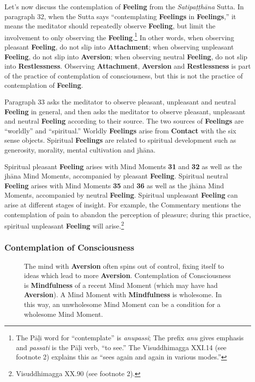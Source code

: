 Let’s now discuss the contemplation of \textbf{Feeling} from the \textit{Satipaṭṭhāna} Sutta. In paragraph 32, when the Sutta says “contemplating \textbf{Feelings} in \textbf{Feelings},” it means the meditator should repeatedly observe \textbf{Feeling}, but limit the involvement to only observing the \textbf{Feeling}.\footnote{The Pāḷi word for “contemplate” is \textit{anupassi}; The prefix \textit{anu} gives emphasis and \textit{passati} is the Pāḷi verb, “to see.” The Visuddhimagga XXI.14 (see footnote 2) explains this as “sees again and again in various modes.”} In other words, when observing pleasant \textbf{Feeling}, do not slip into \textbf{Attachment}; when observing unpleasant \textbf{Feeling}, do not slip into \textbf{Aversion}; when observing neutral \textbf{Feeling}, do not slip into \textbf{Restlessness}. Observing \textbf{Attachment}, \textbf{Aversion} and \textbf{Restlessness} is part of the practice of contemplation of consciousness, but this is not the practice of contemplation of \textbf{Feeling}.

Paragraph 33 asks the meditator to observe pleasant, unpleasant and neutral \textbf{Feeling} in general, and then asks the meditator to observe pleasant, unpleasant and neutral \textbf{Feeling} according to their source. The two sources of \textbf{Feelings} are “worldly” and “spiritual.” Worldly \textbf{Feelings} arise from \textbf{Contact} with the six sense objects. Spiritual \textbf{Feelings} are related to spiritual development such as generosity, morality, mental cultivation and jhāna.

Spiritual pleasant \textbf{Feeling} arises with Mind Moments \textbf{31} and \textbf{32} as well as the jhāna Mind Moments, accompanied by pleasant \textbf{Feeling}. Spiritual neutral \textbf{Feeling} arises with Mind Moments \textbf{35} and \textbf{36} as well as the jhāna Mind Moments, accompanied by neutral \textbf{Feeling}. Spiritual unpleasant \textbf{Feeling} can arise at different stages of insight. For example, the Commentary mentions the contemplation of pain to abandon the perception of pleasure; during this practice, spiritual unpleasant \textbf{Feeling} will arise.\footnote{Visuddhimagga XX.90 (see footnote 2).}

\subsubsection*{Contemplation of Consciousness}

\begin{figure}[H]
\centering

\caption{The mind with \textbf{Aversion} often spins out of control, fixing itself to ideas which lead to more \textbf{Aversion}. Contemplation of Consciousness is \textbf{Mindfulness} of a recent Mind Moment (which may have had \textbf{Aversion}). A Mind Moment with \textbf{Mindfulness} is wholesome. In this way, an unwholesome Mind Moment can be a condition for a wholesome Mind Moment.}
\label{fig:Aversion}
\end{figure}

